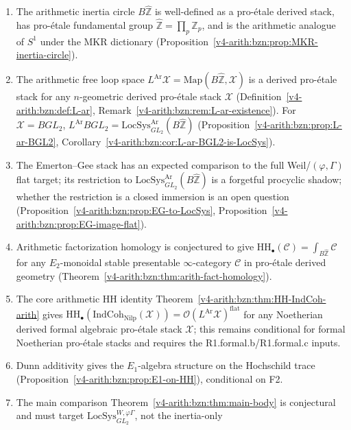\begin{enumerate}
\item The arithmetic inertia circle \(B\widehat{\mathbb{Z}}\) is
well-defined as a pro-\'etale derived stack, has pro-\'etale
fundamental group \(\widehat{\mathbb{Z}}=\prod_{p}\mathbb{Z}_{p}\),
and is the arithmetic analogue of \(S^{1}\) under the MKR dictionary
(Proposition~\ref{v4-arith:bzn:prop:MKR-inertia-circle}).
\item The arithmetic free loop space
\(L^{\mathrm{Ar}}\mathcal{X}=\mathrm{Map}(B\widehat{\mathbb{Z}},\mathcal{X})\)
is a derived pro-\'etale stack for any \(n\)-geometric derived
pro-\'etale stack \(\mathcal{X}\)
(Definition~\ref{v4-arith:bzn:def:L-ar}, Remark~\ref{v4-arith:bzn:rem:L-ar-existence}).
For \(\mathcal{X}=BGL_{2}\), \(L^{\mathrm{Ar}}BGL_{2}=\mathrm{LocSys}^{\mathrm{Ar}}_{GL_{2}}(B\widehat{\mathbb{Z}})\)
(Proposition~\ref{v4-arith:bzn:prop:L-ar-BGL2}, Corollary~\ref{v4-arith:bzn:cor:L-ar-BGL2-is-LocSys}).
\item The Emerton--Gee stack has an expected comparison to the full
Weil/\((\varphi,\Gamma)\) flat target; its restriction to
\(\mathrm{LocSys}^{\mathrm{Ar}}_{GL_{2}}(B\widehat{\mathbb{Z}})\) is a
forgetful procyclic shadow; whether the restriction is a closed
immersion is an open question
(Proposition~\ref{v4-arith:bzn:prop:EG-to-LocSys},
Proposition~\ref{v4-arith:bzn:prop:EG-image-flat}).
\item Arithmetic factorization homology is conjectured to give
\(\mathrm{HH}_{\bullet}(\mathcal{C})=\int_{B\widehat{\mathbb{Z}}}\mathcal{C}\)
for any \(E_{2}\)-monoidal stable presentable \(\infty\)-category
\(\mathcal{C}\) in pro-\'etale derived geometry
(Theorem~\ref{v4-arith:bzn:thm:arith-fact-homology}).
\item The core arithmetic HH identity
Theorem~\ref{v4-arith:bzn:thm:HH-IndCoh-arith} gives
\(\mathrm{HH}_{\bullet}(\mathrm{IndCoh}_{\mathrm{Nilp}}(\mathcal{X}))=\mathcal{O}(L^{\mathrm{Ar}}\mathcal{X})^{\mathrm{flat}}\)
for any Noetherian derived formal algebraic pro-\'etale stack
\(\mathcal{X}\); this remains conditional for formal Noetherian
pro-\'etale stacks and requires the R1.formal.b/R1.formal.c inputs.
\item Dunn additivity gives the \(E_{1}\)-algebra structure on
the Hochschild trace (Proposition~\ref{v4-arith:bzn:prop:E1-on-HH}),
conditional on F2.
\item The main comparison Theorem~\ref{v4-arith:bzn:thm:main-body}
is conjectural and must target
\(\mathrm{LocSys}^{W,\varphi\Gamma}_{GL_{2}}\), not the inertia-only

\end{enumerate}
